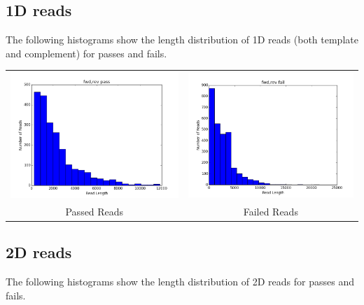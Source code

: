 \subsection*{1D reads}

        The following histograms show the length distribution of 1D reads (both template and complement) for passes and fails.

        \begin{tabular}{cc}
          \includegraphics[width=.48\textwidth]{1Dpasses}
          &
          \includegraphics[width=.48\textwidth]{1Dfailures}
          \\
          Passed Reads
          &
          Failed Reads
        \end{tabular}
        

\subsection*{2D reads}

        The following histograms show the length distribution of 2D reads for passes and fails.

